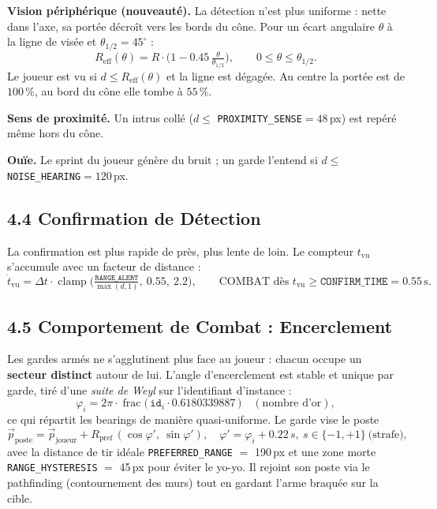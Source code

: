 \documentclass[11pt,a4paper]{article}
\newcommand{\code}[1]{\colorbox{codebg}{\texttt{#1}}}
\newcommand{\param}[2]{\code{#1} $=$ #2}
\begin{document}
\textbf{Vision p\'eriph\'erique (nouveaut\'e).} La d\'etection n'est plus uniforme :
nette dans l'axe, sa port\'ee d\'ecro\^it vers les bords du c\^one. Pour un \'ecart
angulaire $\theta$ \`a la ligne de vis\'ee et $\theta_{1/2}=45^\circ$ :
\[
R_{\text{eff}}(\theta) = R \cdot \Big(1 - 0.45\,\tfrac{\theta}{\theta_{1/2}}\Big),
\qquad 0 \leq \theta \leq \theta_{1/2}.
\]
Le joueur est vu si $d \leq R_{\text{eff}}(\theta)$ et la ligne est d\'egag\'ee.
Au centre la port\'ee est de $100\,\%$, au bord du c\^one elle tombe \`a $55\,\%$.

\textbf{Sens de proximit\'e.} Un intrus coll\'e ($d \leq$ \texttt{PROXIMITY\_SENSE}$=48$\,px)
est rep\'er\'e m\^eme hors du c\^one.

\textbf{Ou\"ie.} Le sprint du joueur g\'en\`ere du bruit ; un garde l'entend si
$d \leq$ \texttt{NOISE\_HEARING}$=120$\,px.

\subsection{4.4 Confirmation de D\'etection}
La confirmation est plus rapide de pr\`es, plus lente de loin. Le compteur $t_{\text{vu}}$
s'accumule avec un facteur de distance :
\[
\dot{t}_{\text{vu}} = \Delta t \cdot \operatorname{clamp}\!\Big(\tfrac{\texttt{RANGE\_ALERT}}{\max(d,1)},\ 0.55,\ 2.2\Big),
\qquad \text{COMBAT d\`es } t_{\text{vu}} \geq \texttt{CONFIRM\_TIME}=0.55\,\text{s}.
\]

\subsection{4.5 Comportement de Combat : Encerclement}
Les gardes arm\'es ne s'agglutinent plus face au joueur : chacun occupe un
\textbf{secteur distinct} autour de lui. L'angle d'encerclement est stable et
unique par garde, tir\'e d'une \emph{suite de Weyl} sur l'identifiant d'instance :
\[
\varphi_i = 2\pi \cdot \operatorname{frac}\!\big(\,\texttt{id}_i \cdot 0.6180339887\,\big)
\quad(\text{nombre d'or}),
\]
ce qui r\'epartit les bearings de mani\`ere quasi-uniforme. Le garde vise le poste
\[
\vec{p}_{\text{poste}} = \vec{p}_{\text{joueur}} + R_{\text{pref}}\,(\cos\varphi',\ \sin\varphi'),
\quad \varphi' = \varphi_i + 0.22\,s,\ s\in\{-1,+1\}\ \text{(strafe)},
\]
avec la distance de tir id\'eale \param{PREFERRED\_RANGE}{190}\,px et une zone morte
\param{RANGE\_HYSTERESIS}{45}\,px pour \'eviter le yo-yo. Il rejoint son poste via
le pathfinding (contournement des murs) tout en gardant l'arme braqu\'ee sur la cible.
\end{document}
